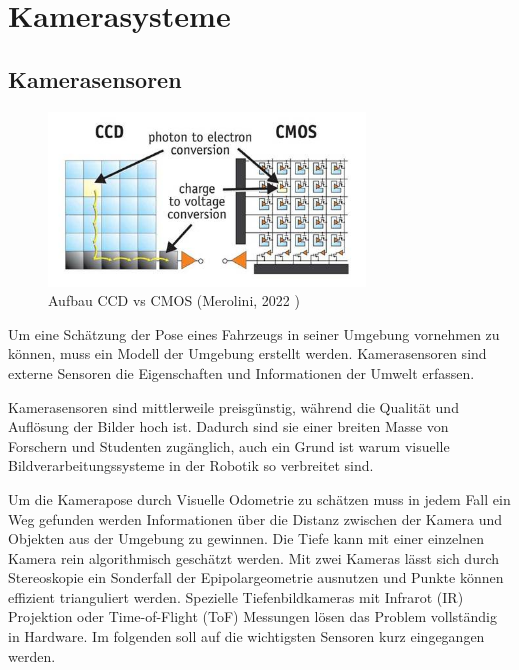 \chapter{Kamerasysteme}
\label{ch:hardware}
\section{Kamerasensoren}
  \begin{figure}
    \centering
    \includegraphics[width=0.75\textwidth]{pictures/04_CCD_CMOS.jpg}
    \caption[Aufbau CCD vs CMOS]{Aufbau CCD vs CMOS (Merolini, 2022 \cite{Merolini.IMG})}
    \label{fig:ccdcmos}
  \end{figure}

  Um eine Schätzung der Pose eines Fahrzeugs in seiner Umgebung vornehmen zu können, muss ein Modell der Umgebung erstellt werden. Kamerasensoren sind externe Sensoren die Eigenschaften und Informationen der Umwelt erfassen.
  \newline  

  Kamerasensoren sind mittlerweile preisgünstig, während die Qualität und Auflösung der Bilder hoch ist. Dadurch sind sie einer breiten Masse von Forschern und Studenten zugänglich, auch ein Grund ist warum visuelle Bildverarbeitungssysteme in der Robotik so verbreitet sind. 
  \newline
  
  Um die Kamerapose durch Visuelle Odometrie zu schätzen muss in jedem Fall ein Weg gefunden werden Informationen über die Distanz zwischen der Kamera und Objekten aus der Umgebung zu gewinnen. Die Tiefe kann mit einer einzelnen Kamera rein algorithmisch geschätzt werden. Mit zwei Kameras lässt sich durch Stereoskopie ein Sonderfall der Epipolargeometrie ausnutzen und Punkte können effizient trianguliert werden. Spezielle Tiefenbildkameras mit Infrarot (IR) Projektion oder Time-of-Flight (ToF) Messungen lösen das Problem vollständig in Hardware. Im folgenden soll auf die wichtigsten Sensoren kurz eingegangen werden.


